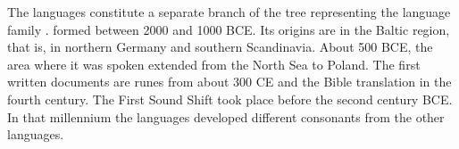 The  languages constitute a separate branch of the tree representing the 
language family \citep[]{Fitch2007a-u}.
 formed between 2000 and
1000 BCE. Its origins are in the Baltic region, that is, in northern Germany and southern
Scandinavia. About 500 BCE, the area where it was spoken extended from the North Sea to Poland.
The first written documents are runes from about 300 CE and the  Bible translation in the fourth century.
The First  Sound Shift took place before the second century BCE. In that millennium the
 languages developed different consonants from the other  languages. 

